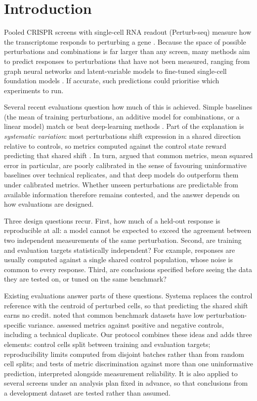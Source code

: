 \section{Introduction}
Pooled CRISPR screens with single-cell RNA readout (Perturb-seq) measure how the transcriptome responds to perturbing a gene \citep{dixit2016,adamson2016,norman2019,replogle2022}. Because the space of possible perturbations and combinations is far larger than any screen, many methods aim to predict responses to perturbations that have not been measured, ranging from graph neural networks \citep{roohani2024} and latent-variable models \citep{lotfollahi2023} to fine-tuned single-cell foundation models \citep{cui2024}. If accurate, such predictions could prioritise which experiments to run.

Several recent evaluations question how much of this is achieved. Simple baselines (the mean of training perturbations, an additive model for combinations, or a linear model) match or beat deep-learning methods \citep{ahlmanneltze2025,csendes2025,wu2024perturbench,li2024comparison}. Part of the explanation is \emph{systematic variation}: most perturbations shift expression in a shared direction relative to controls, so metrics computed against the control state reward predicting that shared shift \citep{vinastorne2025}. In turn, \citet{miller2026} argued that common metrics, mean squared error in particular, are poorly calibrated in the sense of favouring uninformative baselines over technical replicates, and that deep models do outperform them under calibrated metrics. Whether unseen perturbations are predictable from available information therefore remains contested, and the answer depends on how evaluations are designed.

Three design questions recur. First, how much of a held-out response is reproducible at all: a model cannot be expected to exceed the agreement between two independent measurements of the same perturbation. Second, are training and evaluation targets statistically independent? For example, responses are usually computed against a single shared control population, whose noise is common to every response. Third, are conclusions specified before seeing the data they are tested on, or tuned on the same benchmark?

Existing evaluations answer parts of these questions. Systema \citep{vinastorne2025} replaces the control reference with the centroid of perturbed cells, so that predicting the shared shift earns no credit. \citet{csendes2025} noted that common benchmark datasets have low perturbation-specific variance. \citet{miller2026} assessed metrics against positive and negative controls, including a technical duplicate. Our protocol combines these ideas and adds three elements: control cells split between training and evaluation targets; reproducibility limits computed from disjoint batches rather than from random cell splits; and tests of metric discrimination against more than one uninformative prediction, interpreted alongside measurement reliability. It is also applied to several screens under an analysis plan fixed in advance, so that conclusions from a development dataset are tested rather than assumed.

